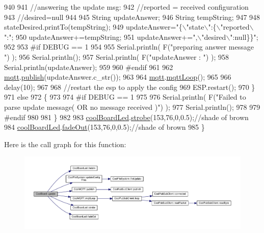 \begin{DoxyCode}
940 
941                 \textcolor{comment}{//answering the update msg:}
942             \textcolor{comment}{//reported = received configuration}
943             \textcolor{comment}{//desired=null}
944         
945             String updateAnswer;
946             String tempString;
947             
948             stateDesired.printTo(tempString);
949             updateAnswer=\textcolor{stringliteral}{"\{\(\backslash\)"state\(\backslash\)":\{\(\backslash\)"reported\(\backslash\)":"};
950             updateAnswer+=tempString;
951             updateAnswer+=\textcolor{stringliteral}{",\(\backslash\)"desired\(\backslash\)":null\}\}"};
952 
953 \textcolor{preprocessor}{        #if DEBUG == 1}
954 
955             Serial.println( F(\textcolor{stringliteral}{"preparing answer message "}) );
956             Serial.println();
957             Serial.println( F(\textcolor{stringliteral}{"updateAnswer : "}) );
958             Serial.println(updateAnswer);
959         
960 \textcolor{preprocessor}{        #endif  }
961 
962             \hyperlink{class_cool_board_a2399f44d7c23c1149a335cb3b46d90f1}{mqtt}.\hyperlink{class_cool_m_q_t_t_ace977b3e90ab14b1199fe5c4fb0a13ec}{publish}(updateAnswer.c\_str());
963             
964             \hyperlink{class_cool_board_a2399f44d7c23c1149a335cb3b46d90f1}{mqtt}.\hyperlink{class_cool_m_q_t_t_aa5eaae967b562b62cbcf2b8d81f6e5d5}{mqttLoop}();
965 
966             delay(10);
967             
968             \textcolor{comment}{//restart the esp to apply the config}
969             ESP.restart();
970     \}
971     \textcolor{keywordflow}{else}
972     \{
973     
974 \textcolor{preprocessor}{    #if DEBUG == 1}
975 
976         Serial.println( F(\textcolor{stringliteral}{"Failed to parse update message( OR no message received )"}) );
977         Serial.println();
978     
979 \textcolor{preprocessor}{    #endif}
980     
981     \}
982 
983     \hyperlink{class_cool_board_a1b1d3c684a5baa56b08486e192fd8e97}{coolBoardLed}.\hyperlink{class_cool_board_led_ad5f0de4c628cbfbf49896042831c64ad}{strobe}(153,76,0,0.5);\textcolor{comment}{//shade of brown}
984     \hyperlink{class_cool_board_a1b1d3c684a5baa56b08486e192fd8e97}{coolBoardLed}.\hyperlink{class_cool_board_led_a93d545679237e8cc858324367149775c}{fadeOut}(153,76,0,0.5);\textcolor{comment}{//shade of brown                              }
985 \}
\end{DoxyCode}
Here is the call graph for this function\+:\nopagebreak
\begin{figure}[H]
\begin{center}
\leavevmode
\includegraphics[width=350pt]{d7/df9/class_cool_board_a8612756d3f73198cdde857a66f0fe690_cgraph}
\end{center}
\end{figure}
